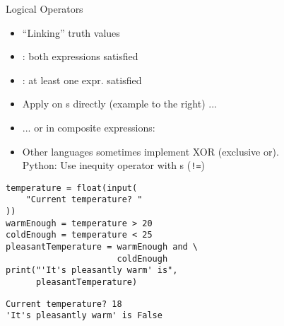 \begin{frame}[fragile]{Logical Operators}
%
\begin{minipage}[t]{.49\linewidth}
\begin{itemize}
\item \enquote{Linking} truth values
\item {}: both expressions satisfied
\item {}: at least one expr. satisfied
\item Apply on s directly (example to the right) ...
\item ... or in composite expressions:\\
\item Other languages sometimes implement XOR (exclusive or).\\
	Python: Use inequity operator with s (\texttt{!=})
\end{itemize}
\end{minipage}
%
\begin{minipage}[t]{.49\linewidth}
\vspace{-6pt}
\begin{codebox}
\begin{verbatim}
temperature = float(input(
    "Current temperature? "
))
warmEnough = temperature > 20
coldEnough = temperature < 25
pleasantTemperature = warmEnough and \
                      coldEnough
print("'It's pleasantly warm' is",
      pleasantTemperature)
\end{verbatim}
\end{codebox}
\begin{cmdbox}
\begin{verbatim}
Current temperature? 18
'It's pleasantly warm' is False
\end{verbatim}
\end{cmdbox}
\end{minipage}
%
\end{frame}


